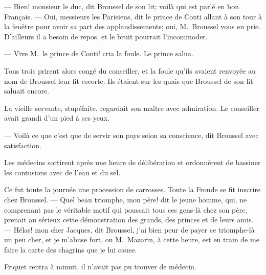 — Bien! monsieur le duc, dit Broussel de son lit; voilà qui est parlé en bon Français. — Oui, messieurs les Parisiens, dit le prince de Conti allant à son tour à la fenêtre pour avoir sa part des applaudissements; oui, M.~Broussel vous en prie. D'ailleurs il a besoin de repos, et le bruit pourrait l'incommoder.

— Vive M.~le prince de Conti! cria la foule. Le prince salua.

Tous trois prirent alors congé du conseiller, et la foule qu'ils avaient renvoyée au nom de Broussel leur fit escorte. Ils étaient sur les quais que Broussel de son lit saluait encore.

La vieille servante, stupéfaite, regardait son maître avec admiration. Le conseiller avait grandi d'un pied à ses yeux.

— Voilà ce que c'est que de servir son pays selon sa conscience, dit Broussel avec satisfaction.

Les médecins sortirent après une heure de délibération et ordonnèrent de bassiner les contusions avec de l'eau et du sel.

Ce fut toute la journée une procession de carrosses. Toute la Fronde se fit inscrire chez Broussel.
— Quel beau triomphe, mon père! dit le jeune homme, qui, ne comprenant pas le véritable motif qui poussait tous ces gens-là chez son père, prenait au sérieux cette démonstration des grands, des princes et de leurs amis. — Hélas! mon cher Jacques, dit Broussel, j'ai bien peur de payer ce triomphe-là un peu cher, et je m'abuse fort, ou M.~Mazarin, à cette heure, est en train de me faire la carte des chagrins que je lui cause.

Friquet rentra à minuit, il n'avait pas pu trouver de médecin.